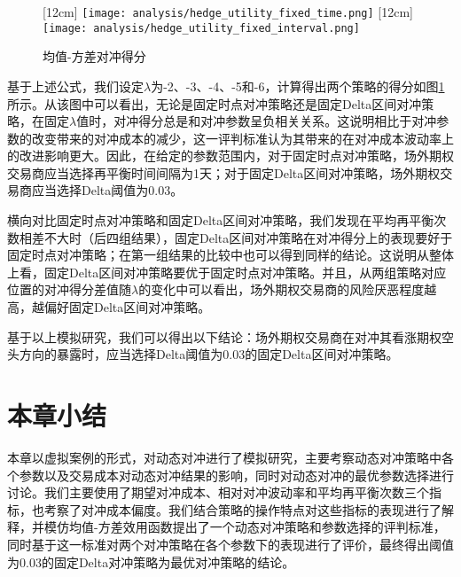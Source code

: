 \begin{figure}[htb]
  \centering
  [12cm]
    {\texttt{[image: analysis/hedge\_utility\_fixed\_time.png]}}
  \hspace{0.5cm}
  [12cm]
    {\texttt{[image: analysis/hedge\_utility\_fixed\_interval.png]}}
    \caption[这里将出现在插图索引中]
    {均值-方差对冲得分}
  \label{fig:hedge_utility}
\end{figure}

基于上述公式，我们设定$\lambda$为-2、-3、-4、-5和-6，计算得出两个策略的得分如图\ref{fig:hedge_utility}所示。从该图中可以看出，无论是固定时点对冲策略还是固定Delta区间对冲策略，在固定$\lambda$值时，对冲得分总是和对冲参数呈负相关关系。这说明相比于对冲参数的改变带来的对冲成本的减少，这一评判标准认为其带来的在对冲成本波动率上的改进影响更大。因此，在给定的参数范围内，对于固定时点对冲策略，场外期权交易商应当选择再平衡时间间隔为1天；对于固定Delta区间对冲策略，场外期权交易商应当选择Delta阈值为0.03。

横向对比固定时点对冲策略和固定Delta区间对冲策略，我们发现在平均再平衡次数相差不大时（后四组结果），固定Delta区间对冲策略在对冲得分上的表现要好于固定时点对冲策略；在第一组结果的比较中也可以得到同样的结论。这说明从整体上看，固定Delta区间对冲策略要优于固定时点对冲策略。并且，从两组策略对应位置的对冲得分差值随$\lambda$的变化中可以看出，场外期权交易商的风险厌恶程度越高，越偏好固定Delta区间对冲策略。

基于以上模拟研究，我们可以得出以下结论：场外期权交易商在对冲其看涨期权空头方向的暴露时，应当选择Delta阈值为0.03的固定Delta区间对冲策略。

\section{本章小结}

本章以虚拟案例的形式，对动态对冲进行了模拟研究，主要考察动态对冲策略中各个参数以及交易成本对动态对冲结果的影响，同时对动态对冲的最优参数选择进行讨论。我们主要使用了期望对冲成本、相对对冲波动率和平均再平衡次数三个指标，也考察了对冲成本偏度。我们结合策略的操作特点对这些指标的表现进行了解释，并模仿均值-方差效用函数提出了一个动态对冲策略和参数选择的评判标准，同时基于这一标准对两个对冲策略在各个参数下的表现进行了评价，最终得出阈值为0.03的固定Delta对冲策略为最优对冲策略的结论。
